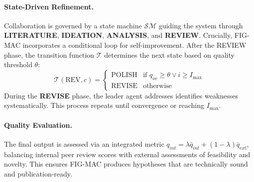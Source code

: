 \paragraph{State-Driven Refinement.}
Collaboration is governed by a state machine $\mathcal{SM}$ guiding the system through \textbf{LITERATURE}, \textbf{IDEATION}, \textbf{ANALYSIS}, and \textbf{REVIEW}. Crucially, FIG-MAC incorporates a conditional loop for self-improvement. After the REVIEW phase, the transition function $\mathcal{T}$ determines the next state based on quality threshold $\theta$:
\begin{equation}
    \mathcal{T}(\text{REV}, c) = 
    \begin{cases} 
        \text{POLISH} & \text{if } q_{ov} \geq \theta \lor i \geq I_{\max} \\
        \text{REVISE} & \text{otherwise}
    \end{cases}
\end{equation}
During the \textbf{REVISE} phase, the leader agent addresses identifies weaknesses systematically. This process repeats until convergence or reaching $I_{\max}$.

\paragraph{Quality Evaluation.}
The final output is assessed via an integrated metric $q_{int} = \lambda \bar{q}_{int} + (1-\lambda) \bar{q}_{ext}$, balancing internal peer review scores with external assessments of feasibility and novelty. This ensures FIG-MAC produces hypotheses that are technically sound and publication-ready.
